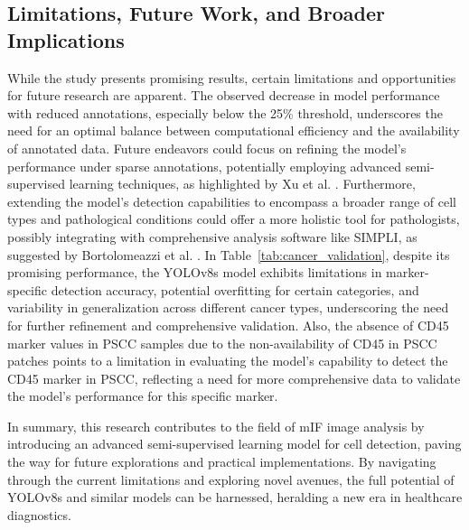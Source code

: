 \documentclass{midl} %
\begin{document}
\subsection{Limitations, Future Work, and Broader Implications}
While the study presents promising results, certain limitations and opportunities for future research are apparent. The observed decrease in model performance with reduced annotations, especially below the 25\% threshold, underscores the need for an optimal balance between computational efficiency and the availability of annotated data. Future endeavors could focus on refining the model's performance under sparse annotations, potentially employing advanced semi-supervised learning techniques, as highlighted by Xu et al. \cite{xu2021end}. Furthermore, extending the model's detection capabilities to encompass a broader range of cell types and pathological conditions could offer a more holistic tool for pathologists, possibly integrating with comprehensive analysis software like SIMPLI, as suggested by Bortolomeazzi et al. \cite{bortolomeazzi2022simpli}. In Table~\ref{tab:cancer_validation}, despite its promising performance, the YOLOv8s model exhibits limitations in marker-specific detection accuracy, potential overfitting for certain categories, and variability in generalization across different cancer types, underscoring the need for further refinement and comprehensive validation. Also, the absence of CD45 marker values in PSCC samples due to the non-availability of CD45 in PSCC patches points to a limitation in evaluating the model's capability to detect the CD45 marker in PSCC, reflecting a need for more comprehensive data to validate the model's performance for this specific marker.

In summary, this research contributes to the field of mIF image analysis by introducing an advanced semi-supervised learning model for cell detection, paving the way for future explorations and practical implementations. By navigating through the current limitations and exploring novel avenues, the full potential of YOLOv8s and similar models can be harnessed, heralding a new era in healthcare diagnostics.





\end{document}
